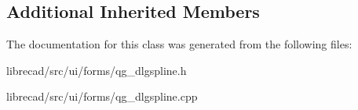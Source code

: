 \subsection*{Additional Inherited Members}


The documentation for this class was generated from the following files\-:\begin{DoxyCompactItemize}
\item 
librecad/src/ui/forms/qg\-\_\-dlgspline.\-h\item 
librecad/src/ui/forms/qg\-\_\-dlgspline.\-cpp\end{DoxyCompactItemize}
